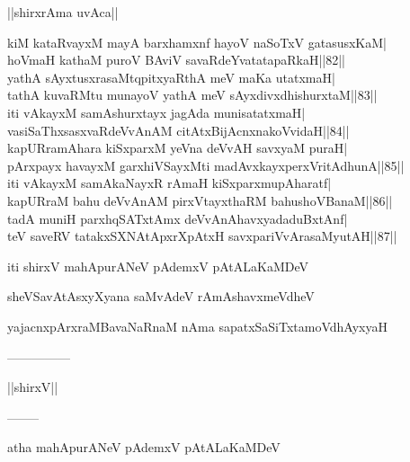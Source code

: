 \documentclass{article}
\begin{document}
\begin{center}
||shirxrAma uvAca||
\end{center}

kiM kataRvayxM mayA barxhamxnf hayoV naSoTxV gatasusxKaM|\\
hoVmaH kathaM puroV BAviV savaRdeYvatatapaRkaH||82||\\
yathA sAyxtusxrasaMtqpitxyaRthA meV maKa utatxmaH|\\
tathA kuvaRMtu munayoV yathA meV sAyxdivxdhishurxtaM||83||\\
iti vAkayxM samAshurxtayx jagAda munisatatxmaH|\\
vasiSaThxsasxvaRdeVvAnAM citAtxBijAcnxnakoVvidaH||84||\\
kapURramAhara kiSxparxM yeVna deVvAH savxyaM puraH|\\
pArxpayx havayxM garxhiVSayxMti madAvxkayxperxVritAdhunA||85||\\
iti vAkayxM samAkaNayxR rAmaH kiSxparxmupAharatf|\\
kapURraM bahu deVvAnAM pirxVtayxthaRM bahushoVBanaM||86||\\
tadA muniH parxhqSATxtAmx deVvAnAhavxyadaduBxtAnf|\\
teV saveRV tatakxSXNAtApxrXpAtxH savxpariVvArasaMyutAH||87||\\

\begin{center}
iti shirxV mahApurANeV pAdemxV pAtALaKaMDeV
\end{center}

\begin{center}
sheVSavAtAsxyXyana saMvAdeV rAmAshavxmeVdheV
\end{center}

\begin{center}
yajacnxpArxraMBavaNaRnaM nAma sapatxSaSiTxtamoVdhAyxyaH
\end{center}

\begin{center}
---------------
\end{center}

\begin{center}
||shirxV||
\end{center}

\begin{center}
--------
\end{center}

\begin{center}
atha mahApurANeV pAdemxV pAtALaKaMDeV
\end{center}
\end{document}
